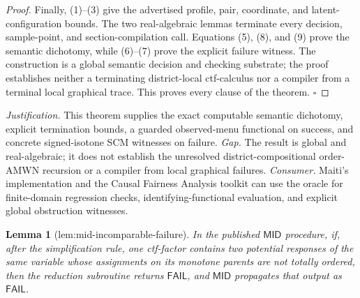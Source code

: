 \documentclass{article}
\newtheorem{lemma}{Lemma}
\begin{document}
\begin{proof}
Finally, (1)--(3) give the advertised profile, pair, coordinate, and latent-configuration bounds.  The two real-algebraic lemmas terminate every decision, sample-point, and section-compilation call.  Equations (5), (8), and (9) prove the semantic dichotomy, while (6)--(7) prove the explicit failure witness.  The construction is a global semantic decision and checking substrate; the proof establishes neither a terminating district-local ctf-calculus nor a compiler from a terminal local graphical trace.  This proves every clause of the theorem. \(\square\)
\end{proof}
\par\smallskip\noindent \textit{Justification.} This theorem supplies the exact computable semantic dichotomy, explicit termination bounds, a guarded observed-menu functional on success, and concrete signed-isotone SCM witnesses on failure. \textit{Gap.} The result is global and real-algebraic; it does not establish the unresolved district-compositional order-AMWN recursion or a compiler from local graphical failures. \textit{Consumer.} Maiti's implementation and the Causal Fairness Analysis toolkit can use the oracle for finite-domain regression checks, identifying-functional evaluation, and explicit global obstruction witnesses.

\begin{lemma}[lem:mid-incomparable-failure]\label{lem:mid-incomparable-failure}
In the published \(\mathsf{MID}\) procedure, if, after the simplification rule, one ctf-factor contains two potential responses of the same variable whose assignments on its monotone parents are not totally ordered, then the reduction subroutine returns \(\mathsf{FAIL}\), and \(\mathsf{MID}\) propagates that output as \(\mathsf{FAIL}\).
\end{lemma}
\end{document}
